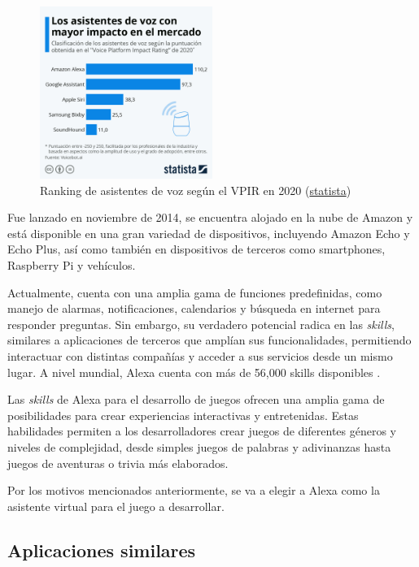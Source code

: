 \begin{figure}[ht]
    \centering
    \includegraphics[width=0.5\textwidth]{imgs/grafico-asistentes.jpeg}
    \caption{Ranking de asistentes de voz según el VPIR en 2020 (\href{https://es.statista.com/grafico/22578/clasificacion-de-los-asistentes-de-voz/}{statista})}
    \label{fig:grafico-asistentes}
\end{figure}

Fue lanzado en noviembre de 2014, se encuentra alojado en la nube de Amazon y está disponible en una gran variedad de dispositivos, incluyendo Amazon Echo y Echo Plus, así como también en dispositivos de terceros como smartphones, Raspberry Pi y vehículos.

Actualmente, cuenta con una amplia gama de funciones predefinidas, como manejo de alarmas, notificaciones, calendarios y búsqueda en internet para responder preguntas. Sin embargo, su verdadero potencial radica en las \textit{skills}, similares a aplicaciones de terceros que amplían sus funcionalidades, permitiendo interactuar con distintas compañías y acceder a sus servicios desde un mismo lugar. A nivel mundial, Alexa cuenta con más de 56,000 skills disponibles \parencite{tfgAlexa2}.

Las \textit{skills} de Alexa para el desarrollo de juegos ofrecen una amplia gama de posibilidades para crear experiencias interactivas y entretenidas. Estas habilidades permiten a los desarrolladores crear juegos de diferentes géneros y niveles de complejidad, desde simples juegos de palabras y adivinanzas hasta juegos de aventuras o trivia más elaborados.

Por los motivos mencionados anteriormente, se va a elegir a Alexa como la asistente virtual para el juego a desarrollar.

\subsection{Aplicaciones similares}

